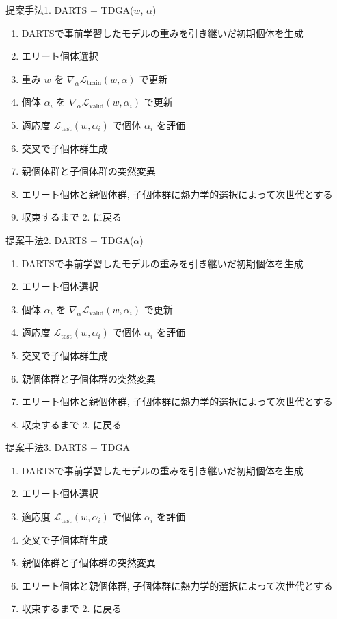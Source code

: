 \begin{algorithm}
  \caption{提案手法1. DARTS + TDGA($w$, $\alpha$)}
  \label{alg1}
  \begin{enumerate}
    \item DARTSで事前学習したモデルの重みを引き継いだ初期個体を生成
    \item エリート個体選択
    \item 重み $w$ を $\displaystyle \nabla_\alpha \mathcal{L}_{\mathrm{train}}(w, \bar{\alpha})$ で更新
    \item 個体 $\alpha_i$ を $\displaystyle \nabla_\alpha \mathcal{L}_{\mathrm{valid}}(w, \alpha_i)$ で更新
    \item 適応度 $\displaystyle \mathcal{L}_{\mathrm{test}}(w, \alpha_i)$ で個体 $\alpha_i$ を評価
    \item 交叉で子個体群生成
    \item 親個体群と子個体群の突然変異
    \item エリート個体と親個体群, 子個体群に熱力学的選択によって次世代とする
    \item 収束するまで 2. に戻る
  \end{enumerate}
\end{algorithm}


\begin{algorithm}
  \caption{提案手法2. DARTS + TDGA($\alpha$)}
  \label{alg2}
  \begin{enumerate}
    \item DARTSで事前学習したモデルの重みを引き継いだ初期個体を生成
    \item エリート個体選択
    \item 個体 $\alpha_i$ を $\displaystyle \nabla_\alpha \mathcal{L}_{\mathrm{valid}}(w, \alpha_i)$ で更新
    \item 適応度 $\displaystyle \mathcal{L}_{\mathrm{test}}(w, \alpha_i)$ で個体 $\alpha_i$ を評価
    \item 交叉で子個体群生成
    \item 親個体群と子個体群の突然変異
    \item エリート個体と親個体群, 子個体群に熱力学的選択によって次世代とする
    \item 収束するまで 2. に戻る
  \end{enumerate}
\end{algorithm}

\begin{algorithm}
  \caption{提案手法3. DARTS + TDGA}
  \label{alg3}
  \begin{enumerate}
    \item DARTSで事前学習したモデルの重みを引き継いだ初期個体を生成
    \item エリート個体選択
    \item 適応度 $\displaystyle \mathcal{L}_{\mathrm{test}}(w, \alpha_i)$ で個体 $\alpha_i$ を評価
    \item 交叉で子個体群生成
    \item 親個体群と子個体群の突然変異
    \item エリート個体と親個体群, 子個体群に熱力学的選択によって次世代とする
    \item 収束するまで 2. に戻る
  \end{enumerate}
\end{algorithm}


